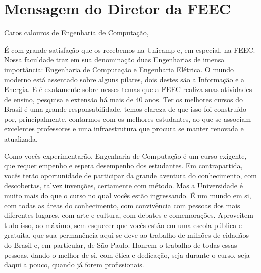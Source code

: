 
\section{Mensagem do Diretor da FEEC}

Caros calouros de Engenharia de Computação,

É com grande satisfação que os recebemos na Unicamp e, em especial, na FEEC.
Nossa faculdade traz em sua denominação duas Engenharias de imensa importância:
Engenharia de Computação e Engenharia Elétrica.  O mundo moderno está assentado
sobre alguns pilares, dois destes são a Informação e a Energia.  E é exatamente
sobre nesses temas que a FEEC realiza suas atividades de ensino, pesquisa e
extensão há mais de 40 anos.  Ter os melhores cursos do Brasil é uma grande
responsabilidade. temos clareza de que isso foi construído por, principalmente,
contarmos com os melhores estudantes, ao que se associam excelentes professores
e uma infraestrutura que procura se manter renovada e atualizada.

Como vocês
experimentarão, Engenharia de Computação é um curso exigente, que requer
empenho e espera desempenho dos estudantes. Em contrapartida, vocês terão
oportunidade de participar da grande aventura do conhecimento, com descobertas,
talvez invenções, certamente com método.  Mas a Universidade é muito mais do
que o curso no qual vocês estão ingressando. É um mundo em si, com todas as
áreas do conhecimento, com convivência com pessoas dos mais diferentes lugares,
com arte e cultura, com debates e comemorações.  Aproveitem tudo isso, ao
máximo, sem esquecer que vocês estão em uma escola pública e gratuita, que sua
permanência aqui se deve ao trabalho de milhões de cidadãos do Brasil e, em
particular, de São Paulo. Honrem o trabalho de todas essas pessoas, dando o
melhor de si, com ética e dedicação, seja durante o curso, seja daqui a pouco,
quando já forem profissionais.

